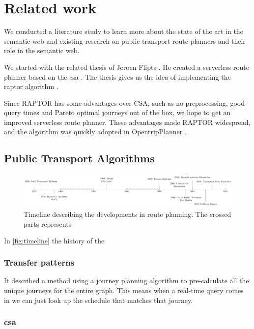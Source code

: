 \chapter{Related work}
\label{chap:rel_work}

We conducted a literature study to learn more about the state of the art in the semantic web and existing research on public transport route planners and their role in the semantic web.

We started with the related thesis of Jeroen Flipts \cite{Flipts2020}. He created a serverless route planner based on the \acrfull{csa} \cite{csa}. The thesis gives us the idea of implementing the \acrfull{raptor} algorithm \cite{Delling2014Oct}.

Since RAPTOR has some advantages over CSA, such as no preprocessing, good query times and Pareto optimal journeys out of the box, we hope to get an improved serverless route planner. These advantages made RAPTOR widespread, and the algorithm was quickly adopted in OpentripPlanner \cite{raptorinopentripplanner}.

\section{Public Transport Algorithms}
\begin{figure}[H]
    \centering
    \includegraphics[width=\textwidth]{images/timeline.png}
    \caption{Timeline describing the developments in route planning. The crossed parts represents }
    \label{fig:timeline}
\end{figure}
In \autoref{fig:timeline} the history of the 
\subsection{Transfer patterns}
It described a method using a journey planning algorithm to pre-calculate all the unique journeys for the entire graph. This means when a real-time query comes in we can just look up the schedule that matches that journey.
\subsection{\acrfull{csa}}
